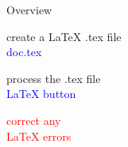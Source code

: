 \documentclass{beamer}
\newcommand{\bc}{\begin{center}}
\newcommand{\ec}{\end{center}}
\newcommand{\lx}{{\LaTeX} }
\def\mynormal{\vspace*{-0.5cm}}
\begin{document}
\begin{frame}{Overview}
\mynormal
\medskip
\bc
create a \lx .tex file\\
\textcolor{blue}{doc.tex}
\ec
\vspace{-0.5cm}
\begin{center}
\end{center}
\vspace{-0.8cm}
\bc
process the .tex file\\
\textcolor{blue}{LaTeX button}
\ec
\vspace{-2.0cm}
\begin{flushright}
\parbox{3cm}{\textcolor{red}{correct any\\ \lx  errors}}
\end{flushright}
\vspace{0.1cm}
\begin{center}

\end{center}
\end{frame}
\end{document}
